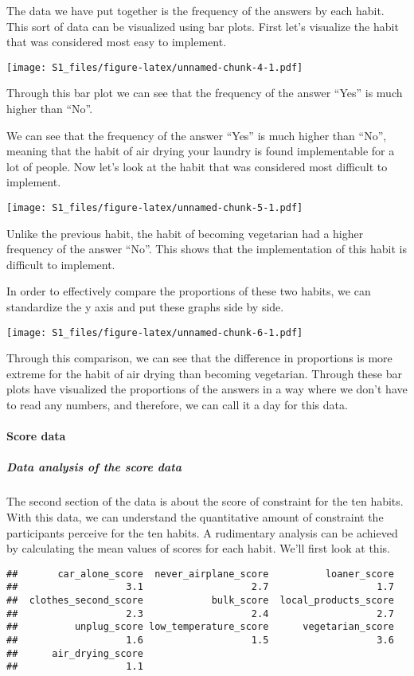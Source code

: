 \documentclass[
]{article}
\begin{document}
The data we have put together is the frequency of the answers by each
habit. This sort of data can be visualized using bar plots. First let's
visualize the habit that was considered most easy to implement.

\texttt{[image: S1\_files/figure-latex/unnamed-chunk-4-1.pdf]}

Through this bar plot we can see that the frequency of the answer
``Yes'' is much higher than ``No''.

We can see that the frequency of the answer ``Yes'' is much higher than
``No'', meaning that the habit of air drying your laundry is found
implementable for a lot of people. Now let's look at the habit that was
considered most difficult to implement.

\texttt{[image: S1\_files/figure-latex/unnamed-chunk-5-1.pdf]}

Unlike the previous habit, the habit of becoming vegetarian had a higher
frequency of the answer ``No''. This shows that the implementation of
this habit is difficult to implement.

In order to effectively compare the proportions of these two habits, we
can standardize the y axis and put these graphs side by side.

\texttt{[image: S1\_files/figure-latex/unnamed-chunk-6-1.pdf]}

Through this comparison, we can see that the difference in proportions
is more extreme for the habit of air drying than becoming vegetarian.
Through these bar plots have visualized the proportions of the answers
in a way where we don't have to read any numbers, and therefore, we can
call it a day for this data.

\hypertarget{score-data}{%
\paragraph{Score data}\label{score-data}}

\hypertarget{data-analysis-of-the-score-data}{%
\subparagraph{Data analysis of the score
data}\label{data-analysis-of-the-score-data}}

The second section of the data is about the score of constraint for the
ten habits. With this data, we can understand the quantitative amount of
constraint the participants perceive for the ten habits. A rudimentary
analysis can be achieved by calculating the mean values of scores for
each habit. We'll first look at this.

\begin{verbatim}
##       car_alone_score  never_airplane_score          loaner_score 
##                   3.1                   2.7                   1.7 
##  clothes_second_score            bulk_score  local_products_score 
##                   2.3                   2.4                   2.7 
##          unplug_score low_temperature_score      vegetarian_score 
##                   1.6                   1.5                   3.6 
##      air_drying_score 
##                   1.1
\end{verbatim}
\end{document}
